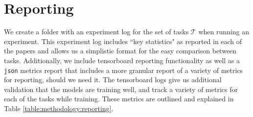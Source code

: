 \section{Reporting} \label{section:methodology:reporting}
We create a folder with an experiment log for the set of tasks $\mathcal{T}$ when running an experiment. This experiment log includes ``key statistics" as reported in each of the papers and allows us a simplistic format for the easy comparison between tasks. Additionally, we include tensorboard reporting functionality \cite{tensorboard} as well as a \texttt{json} metrics report that includes a more granular report of a variety of metrics for reporting, should we need it. The tensorboard logs give us additional validation that the models are training well, and track a variety of metrics for each of the tasks while training. These metrics are outlined and explained in Table \ref{table:methodology:reporting}.
